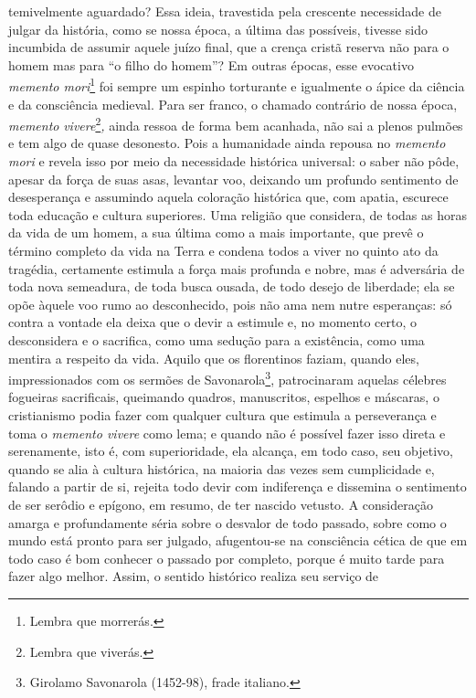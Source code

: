 temivelmente aguardado? Essa ideia, travestida pela crescente
necessidade de julgar da história, como se nossa época, a última das
possíveis, tivesse sido incumbida de assumir aquele juízo final, que a
crença cristã reserva não para o homem mas para ``o filho do homem''? Em
outras épocas, esse evocativo \emph{memento mori}\footnote{Lembra que
  morrerás.} foi sempre um espinho torturante e igualmente o ápice da
ciência e da consciência medieval. Para ser franco, o chamado contrário
de nossa época, \emph{memento} \emph{vivere}\footnote{Lembra que
  viverás.}\emph{,} ainda ressoa de forma bem acanhada, não sai a plenos
pulmões e tem algo de quase desonesto. Pois a humanidade ainda repousa
no \emph{memento mori} e revela isso por meio da necessidade histórica
universal: o saber não pôde, apesar da força de suas asas, levantar voo,
deixando um profundo sentimento de desesperança e assumindo aquela
coloração histórica que, com apatia, escurece toda educação e cultura
superiores. Uma religião que considera, de todas as horas da vida de um
homem, a sua última como a mais importante, que prevê o término completo
da vida na Terra e condena todos a viver no quinto ato da tragédia,
certamente estimula a força mais profunda e nobre, mas é adversária de
toda nova semeadura, de toda busca ousada, de todo desejo de liberdade;
ela se opõe àquele voo rumo ao desconhecido, pois não ama nem nutre
esperanças: só contra a vontade ela deixa que o devir a estimule e, no
momento certo, o desconsidera e o sacrifica, como uma sedução para a
existência, como uma mentira a respeito da vida. Aquilo que os
florentinos faziam, quando eles, impressionados com os sermões de
Savonarola\footnote{Girolamo Savonarola (1452-98), frade italiano.},
patrocinaram aquelas célebres fogueiras sacrificais, queimando quadros,
manuscritos, espelhos e máscaras, o cristianismo podia fazer com
qualquer cultura que estimula a perseverança e toma o \emph{memento
vivere} como lema; e quando não é possível fazer isso direta e
serenamente, isto é, com superioridade, ela alcança, em todo caso, seu
objetivo, quando se alia à cultura histórica, na maioria das vezes sem
cumplicidade e, falando a partir de si, rejeita todo devir com
indiferença e dissemina o sentimento de ser serôdio e epígono, em
resumo, de ter nascido vetusto. A consideração amarga e profundamente
séria sobre o desvalor de todo passado, sobre como o mundo está pronto
para ser julgado, afugentou-se na consciência cética de que em todo 
caso é bom conhecer o passado por completo, porque é muito tarde para
fazer algo melhor. Assim, o sentido histórico realiza seu serviço de
